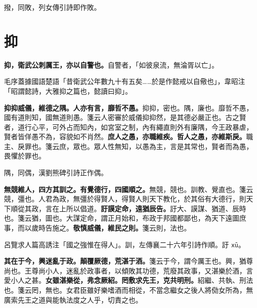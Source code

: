 \begin{quoting}撥，同敗，列女傳引詩即作敗。\end{quoting}

\section{抑}


\textbf{抑，衛武公刺厲王，亦以自警也。}{\footnotesize 自警者，「如彼泉流，無淪胥以亡」。}

\begin{quoting}毛序蓋據國語楚語「昔衛武公年數九十有五矣……於是作懿戒以自儆也」，韋昭注「昭謂懿詩，大雅抑之篇也，懿讀曰抑」。\end{quoting}

\textbf{抑抑威儀，維德之隅。人亦有言，靡哲不愚。}{\footnotesize 抑抑，密也。隅，廉也。靡哲不愚，國有道則知，國無道則愚。箋云人密審於威儀抑抑然，是其德必嚴正也。古之賢者，道行心平，可外占而知內，如宮室之制，內有繩直則外有廉隅，今王政暴虐，賢者皆佯愚不為，容貌如不肖然。}\textbf{庶人之愚，亦職維疾。哲人之愚，亦維斯戾。}{\footnotesize 職主、戾罪也。箋云庶，眾也。眾人性無知，以愚為主，言是其常也，賢者而為愚，畏懼於罪也。}

\begin{quoting}隅，同偶，漢劉熊碑引詩正作偶。\end{quoting}

\textbf{無競維人，四方其訓之。有覺德行，四國順之。}{\footnotesize 無競，競也。訓教、覺直也。箋云競，彊也。人君為政，無彊於得賢人，得賢人則天下教化，於其俗有大德行，則天下順從其政，言在上所以倡道。}\textbf{訏謨定命，遠猶辰告。}{\footnotesize 訏大、謨謀、猶道、辰時也。箋云猶，圖也。大謀定命，謂正月始和，布政于邦國都鄙也，為天下遠圖庶事，而以歲時告施之。}\textbf{敬慎威儀，維民之則。}{\footnotesize 箋云則，法也。}

\begin{quoting}呂覽求人篇高誘注「國之強惟在得人」。訓，左傳襄二十六年引詩作順。訏 \texttt{xū}。\end{quoting}

\textbf{其在于今，興迷亂于政。顛覆厥德，荒湛于酒。}{\footnotesize 箋云于今，謂今厲王也。興，猶尊尚也。王尊尚小人，迷亂於政事者，以傾敗其功德，荒廢其政事，又湛樂於酒，言愛小人之甚。}\textbf{女雖湛樂從，弗念厥紹。罔敷求先王，克共明刑。}{\footnotesize 紹繼、共執、刑法也。箋云罔，無也。女君臣雖好樂嗜酒而相從，不當念繼女之後人將俲女所為，無廣索先王之道與能執法度之人乎，切責之也。}

